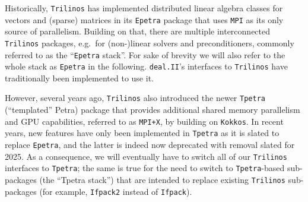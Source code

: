 \documentclass{ansarticle-preprint}
\newcommand{\specialword}[1]{\texttt{#1}}
\newcommand{\dealii}{{\specialword{deal.II}}\xspace}
\newcommand{\trilinos}{{\specialword{Trilinos}}\xspace}
\newcommand{\MPI}{{\specialword{MPI}}\xspace}
\newcommand{\MPIx}{{\specialword{MPI+X}}\xspace}
\newcommand{\kokkos}{{\specialword{Kokkos}}\xspace}
\newcommand{\epetra}{{\specialword{Epetra}}\xspace}
\newcommand{\tpetra}{{\specialword{Tpetra}}\xspace}
\begin{document}
Historically, \trilinos{} has implemented distributed linear algebra classes for vectors and (sparse) matrices in its
\epetra{} package that uses \MPI{} as its only source of
parallelism. Building on that, there are multiple interconnected \trilinos{} packages, e.g.\ for (non-)linear solvers 
and preconditioners, commonly referred to as the 
``\epetra{} stack''. For sake of brevity we will also refer to the whole stack as \epetra{} in the following.
\dealii{}'s interfaces to \trilinos{} have traditionally 
been implemented to use it.

However, several years ago, \trilinos{} also introduced the
newer \tpetra{} (``templated'' Petra) package that provides additional shared memory
parallelism and GPU capabilities, referred to as \MPIx, by building on \kokkos{}. 
In recent years, new features have only been implemented in \tpetra{} as 
it is slated to replace \epetra{}, and the latter is indeed
now deprecated with removal slated for 2025. 
As a consequence, 
we will eventually have to switch all of our \trilinos{} interfaces to \tpetra{}; 
the same is true for the need to switch to \tpetra{}-based
sub-packages (the ``Tpetra stack'') that are intended to replace existing \trilinos{} sub-packages 
(for example, \texttt{Ifpack2} instead of \texttt{Ifpack}).
\end{document}
